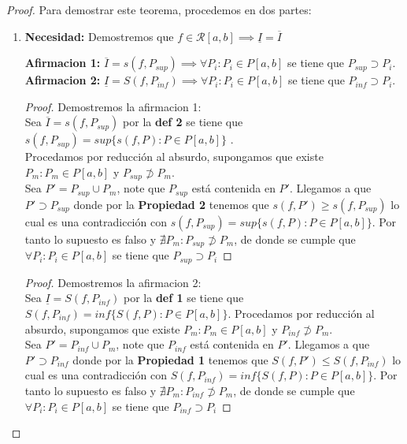 \documentclass{article}
\begin{document}
\begin{proof}
Para demostrar este teorema, procedemos en dos partes:
\begin{enumerate}
    \item \textbf{Necesidad:} 
Demostremos que  \(f \in \mathcal{R}[a, b] \implies \underline{I} = \overline{I} \)

    \textbf{Afirmacion 1:} \(\overline{I} = s(f, P_{sup}) \implies \forall  P_i: P_i \in P[a,b]\) se tiene que \(P_{sup} \supset P_i\).\\
    \textbf{Afirmacion 2:} \(\underline{I} = S(f, P_{inf}) \implies \forall  P_i: P_i \in P[a,b]\) se tiene que \(P_{inf} \supset P_i\).
\begin{proof}
Demostremos la afirmacion 1:\\

Sea \(\overline{I} = s(f, P_{sup})\) por la \textbf{def 2} se tiene que \(s(f, P_{sup}) = sup\{ s(f, P): P \in P[a, b] \}\) .\\
Procedamos por reducción al absurdo, supongamos que existe \(P_m: P_m \in P[a, b]\) y \(P_{sup} \not\supset P_m\).\\
Sea \(P' = P_{sup} \cup  P_m\), note que \(P_{sup}\) está contenida en \(P'\). Llegamos a que \(P' \supset P_{sup}\) donde por la \textbf{Propiedad 2}  tenemos que \(s(f, P') \geq s(f, P_{sup})\) lo cual es una contradicción con  \(s(f, P_{sup}) = sup\{ s(f, P): P \in P[a, b] \}\). Por tanto lo supuesto es falso y \( \nexists P_m: P_{sup} \not\supset P_m \), de donde se cumple que  \(\forall  P_i: P_i \in P[a,b]\) se tiene que \(P_{sup} \supset P_i\)
\end{proof}

\begin{proof}
Demostremos la afirmacion 2:\\

Sea \(\underline{I} = S(f, P_{inf})\) por la \textbf{def 1} se tiene que \(S(f, P_{inf}) = inf\{ S(f, P): P \in P[a, b] \}\).
Procedamos por reducción al absurdo, supongamos que existe \(P_m: P_m \in P[a, b]\) y \(P_{inf} \not\supset P_m\).\\
Sea \(P' = P_{inf} \cup  P_m\), note que \(P_{inf}\) está contenida en \(P'\). Llegamos a que \(P' \supset P_{inf}\) donde por la \textbf{Propiedad 1}  tenemos que \(S(f, P') \leq S(f, P_{inf})\) lo cual es una contradicción con  \(S(f, P_{inf}) = inf\{ S(f, P): P \in P[a, b] \}\). Por tanto lo supuesto es falso y \( \nexists P_m: P_{inf} \not\supset P_m \), de donde se cumple que  \(\forall  P_i: P_i \in P[a,b]\) se tiene que \(P_{inf} \supset P_i\)
\end{proof}


\end{enumerate}
\end{proof}
\end{document}

